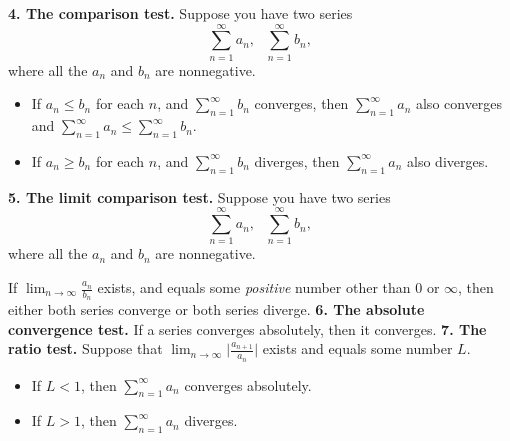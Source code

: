 \documentclass[12pt]{article}
\begin{document}
\vskip 10pt
{\bf 4. The comparison test.} Suppose you have two series
\[ \sum_{n = 1}^{\infty} a_n, \ \ \ \sum_{n = 1}^{\infty} b_n,\]
where all the $a_n$ and $b_n$ are nonnegative.

\begin{itemize}
\item
If $a_n \leq b_n$ for each $n$, and $\sum_{n = 1}^{\infty} b_n$ converges, then
$\sum_{n = 1}^{\infty} a_n$ also converges and $\sum_{n = 1}^{\infty} a_n \leq
\sum_{n = 1}^{\infty} b_n$.
\item
If $a_n \geq b_n$ for each $n$, and $\sum_{n = 1}^{\infty} b_n$ diverges, then
$\sum_{n = 1}^{\infty} a_n$ also diverges.
\end{itemize}
\vskip 10pt
{\bf 5. The limit comparison test.}
Suppose you have two series
\[ \sum_{n = 1}^{\infty} a_n, \ \ \ \sum_{n = 1}^{\infty} b_n,\]
where all the $a_n$ and $b_n$ are nonnegative.

If $\lim_{n \rightarrow \infty} \frac{a_n}{b_n}$ exists, and equals some
{\itshape positive} number other than $0$ or $\infty$, then either both
series converge or both series diverge.
\vskip 10pt
{\bf 6. The absolute convergence test.}
If a series converges absolutely, then it converges.
\vskip 10pt
{\bf 7. The ratio test.}
Suppose that $\lim_{n \rightarrow \infty} \bigg| \frac{ a_{n + 1} }{a_n} \bigg|$
exists and equals some number $L$.

\begin{itemize}
\item
If $L < 1$, then $\sum_{n = 1}^{\infty} a_n$ converges absolutely.
\item
If $L > 1$, then $\sum_{n = 1}^{\infty} a_n$ diverges.
\end{itemize}
\end{document}

